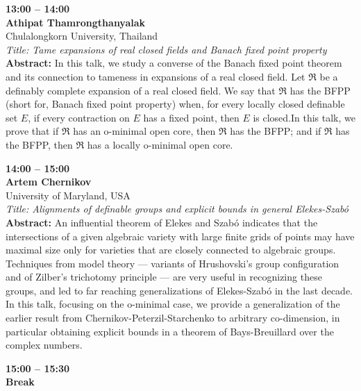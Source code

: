 \documentclass[10pt,a4paper]{article}
\begin{document}
\begin{tcolorbox}[talkbox]
\textbf{13:00 -- 14:00} \\
\textbf{Athipat Thamrongthanyalak} \\
Chulalongkorn University, Thailand \\
\textit{Title: Tame expansions of real closed fields and Banach fixed point property} \\
\textbf{Abstract:} In this talk, we study a converse of the Banach fixed point theorem and its connection to tameness in expansions of a real closed field. Let $\mathfrak R$ be a definably complete expansion of a real closed field. We say that $\mathfrak R$ has the BFPP (short for, Banach fixed point property) when, for every locally closed definable set $E$, if every contraction on $E$ has a fixed point, then $E$ is closed.In this talk, we prove that if $\mathfrak R$ has an o-minimal open core, then $\mathfrak R$ has the BFPP; and if $\mathfrak R$ has the BFPP, then $\mathfrak R$ has a locally o-minimal open core.
\end{tcolorbox}
\begin{tcolorbox}[talkbox]
\textbf{14:00 -- 15:00} \\
\textbf{Artem Chernikov} \\
University of Maryland, USA \\
\textit{Title: Alignments of definable groups and explicit bounds in general Elekes-Szabó} \\
\textbf{Abstract:} An influential theorem of Elekes and Szabó indicates that the intersections of a given algebraic variety with large finite grids of points may have maximal size only for varieties that are closely connected to algebraic groups.  Techniques from model theory --- variants of Hrushovski's group configuration and of Zilber's trichotomy principle --- are very useful in recognizing these groups, and led to far reaching generalizations of Elekes-Szabó in the last decade. In this talk, focusing on the o-minimal case, we provide a generalization of the earlier result from Chernikov-Peterzil-Starchenko to arbitrary co-dimension, in particular obtaining explicit bounds in a theorem of Bays-Breuillard over the complex numbers.
\end{tcolorbox}
\begin{tcolorbox}[talkbox]
\textbf{15:00 -- 15:30} \\
\textbf{Break}
\end{tcolorbox}
\end{document}
